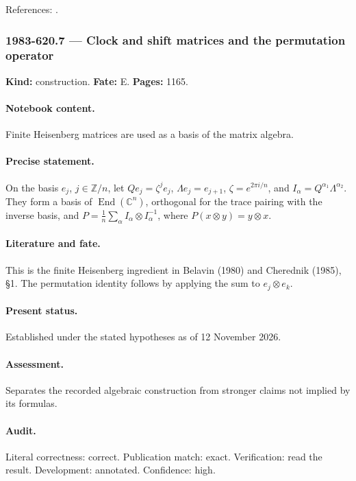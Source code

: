 \noindent References: \citep{belavin1980discrete,cherednik1985finite}.\par

\subsubsection{1983-620.7 --- Clock and shift matrices and the permutation operator}

\label{item:1983-620.7}

\noindent\textbf{Kind:} construction. \textbf{Fate:} E. \textbf{Pages:} 1165.\par

\paragraph{Notebook content.} Finite Heisenberg matrices are used as a basis of the matrix algebra.

\paragraph{Precise statement.} On the basis \(e_j\), \(j\in\mathbb Z/n\), let \(Qe_j=\zeta^je_j\), \(\Lambda e_j=e_{j+1}\), \(\zeta=e^{2\pi i/n}\), and \(I_\alpha=Q^{\alpha_1}\Lambda^{\alpha_2}\). They form a basis of \(\operatorname{End}(\mathbb C^n)\), orthogonal for the trace pairing with the inverse basis, and \(P=\frac1n\sum_\alpha I_\alpha\otimes I_\alpha^{-1}\), where \(P(x\otimes y)=y\otimes x\).

\paragraph{Literature and fate.} This is the finite Heisenberg ingredient in Belavin (1980) and Cherednik (1985), \S1. The permutation identity follows by applying the sum to \(e_j\otimes e_k\).

\paragraph{Present status.} Established under the stated hypotheses as of 12 November 2026.

\paragraph{Assessment.} Separates the recorded algebraic construction from stronger claims not implied by its formulas.

\paragraph{Audit.} Literal correctness: correct. Publication match: exact. Verification: read the result. Development: annotated. Confidence: high.

